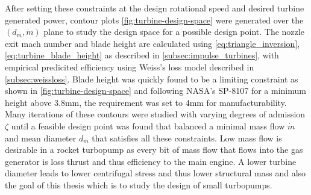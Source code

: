 


After setting these constraints at the design rotational speed and desired turbine generated power, contour plots \cref{fig:turbine-design-space} were generated over the $(d_m, \dot{m})$ plane to study the design space for a possible design point. The nozzle exit mach number and blade height are calculated using \cref{eq:triangle_inversion}, \cref{eq:turbine_blade_height} as described in \cref{subsec:impulse_turbines}, with empirical predicited efficiency using Weiss's loss model described in \cref{subsec:weissloss}. Blade height was quickly found to be a limiting constraint as shown in \cref{fig:turbine-design-space} and following NASA's SP-8107 for a minimum height above 3.8mm, the requirement was set to 4mm for manufacturability. Many iterations of these contours were studied with varying degrees of admission $\zeta$ until a feasible design point was found that balanced a minimal mass flow $\dot{m}$ and mean diameter $d_m$ that satisfies all these constraints. Low mass flow is desirable in a rocket turbopump as every bit of mass flow that flows into the gas generator is loss thrust and thus efficiency to the main engine. A lower turbine diameter leads to lower centrifugal stress and thus lower structural mass and also the goal of this thesis which is to study the design of small turbopumps.



